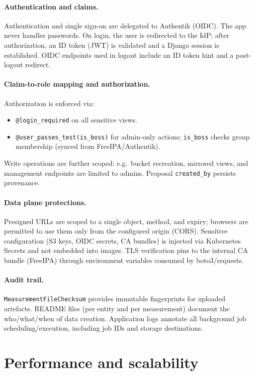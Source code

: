\paragraph{Authentication and claims.}
Authentication and single sign-on are delegated to Authentik (OIDC). The app never handles passwords. On login, the user is redirected to the IdP; after authorization, an ID token (JWT) is validated and a Django session is established. OIDC endpoints used in logout include an ID token hint and a post-logout redirect.

\paragraph{Claim-to-role mapping and authorization.}
Authorization is enforced via:
\begin{itemize}
	\item \texttt{@login\_required} on all sensitive views.
	\item \texttt{@user\_passes\_test(is\_boss)} for admin-only actions; \texttt{is\_boss} checks group membership (synced from FreeIPA/Authentik).
\end{itemize}
Write operations are further scoped: e.g.\ bucket recreation, mirrored views, and management endpoints are limited to admins. Proposal \texttt{created\_by} persists provenance.

\paragraph{Data plane protections.}
Presigned URLs are scoped to a single object, method, and expiry; browsers are permitted to use them only from the configured origin (CORS). Sensitive configuration (S3 keys, OIDC secrets, CA bundles) is injected via Kubernetes Secrets and not embedded into images. TLS verification pins to the internal CA bundle (FreeIPA) through environment variables consumed by boto3/requests.

\paragraph{Audit trail.}
\texttt{MeasurementFileChecksum} provides immutable fingerprints for uploaded artefacts. README files (per entity and per measurement) document the who/what/when of data creation. Application logs annotate all background job scheduling/execution, including job IDs and storage destinations.

\section{Performance and scalability}\label{sec:performance}

